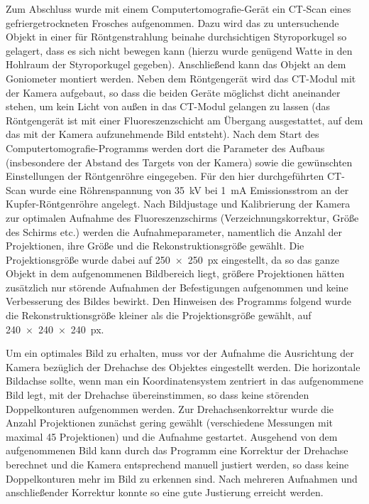 \documentclass[11pt, a4paper]{article}
\numberwithin{equation}{section}
\begin{document}
Zum Abschluss wurde mit einem Computertomografie-Gerät ein CT-Scan eines gefriergetrockneten Frosches aufgenommen.
Dazu wird das zu untersuchende Objekt in einer für Röntgenstrahlung beinahe durchsichtigen Styroporkugel so gelagert, dass es sich nicht bewegen kann (hierzu wurde genügend Watte in den Hohlraum der Styroporkugel gegeben).
Anschließend kann das Objekt an dem Goniometer montiert werden.
Neben dem Röntgengerät wird das CT-Modul mit der Kamera aufgebaut, so dass die beiden Geräte möglichst dicht aneinander stehen, um kein Licht von außen in das CT-Modul gelangen zu lassen (das Röntgengerät ist mit einer Fluoreszenzschicht am Übergang ausgestattet, auf dem das mit der Kamera aufzunehmende Bild entsteht).
Nach dem Start des Computertomografie-Programms werden dort die Parameter des Aufbaus (insbesondere der Abstand des Targets von der Kamera) sowie die gewünschten Einstellungen der Röntgenröhre eingegeben.
Für den hier durchgeführten CT-Scan wurde eine Röhrenspannung von \SI{35}{\kilo\volt} bei \SI{1}{\milli\ampere} Emissionsstrom an der Kupfer-Röntgenröhre angelegt.
Nach Bildjustage und Kalibrierung der Kamera zur optimalen Aufnahme des Fluoreszenzschirms (Verzeichnungskorrektur, Größe des Schirms etc.) werden die Aufnahmeparameter, namentlich die Anzahl der Projektionen, ihre Größe und die Rekonstruktionsgröße gewählt.
Die Projektionsgröße wurde dabei auf \SI{250x250}{px} eingestellt, da so das ganze Objekt in dem aufgenommenen Bildbereich liegt, größere Projektionen hätten zusätzlich nur störende Aufnahmen der Befestigungen aufgenommen und keine Verbesserung des Bildes bewirkt.
Den Hinweisen des Programms folgend wurde die Rekonstruktionsgröße kleiner als die Projektionsgröße gewählt, auf \SI{240x240x240}{px}.

Um ein optimales Bild zu erhalten, muss vor der Aufnahme die Ausrichtung der Kamera bezüglich der Drehachse des Objektes eingestellt werden.
Die horizontale Bildachse sollte, wenn man ein Koordinatensystem zentriert in das aufgenommene Bild legt, mit der Drehachse übereinstimmen, so dass keine störenden Doppelkonturen aufgenommen werden.
Zur Drehachsenkorrektur wurde die Anzahl Projektionen zunächst gering gewählt (verschiedene Messungen mit maximal \num{45} Projektionen) und die Aufnahme gestartet.
Ausgehend von dem aufgenommenen Bild kann durch das Programm eine Korrektur der Drehachse berechnet und die Kamera entsprechend manuell justiert werden, so dass keine Doppelkonturen mehr im Bild zu erkennen sind.
Nach mehreren Aufnahmen und anschließender Korrektur konnte so eine gute Justierung erreicht werden.
\end{document}
